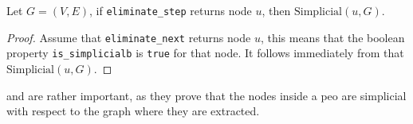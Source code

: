 \begin{corollary}\label{cor:essound1}
    Let $G = (V, E)$, if \texttt{eliminate\_step} returns node $u$, then $\mathrm{Simplicial}(u, G)$.
\end{corollary}
\begin{proof}
    Assume that \texttt{eliminate\_next} returns node $u$, this means that the boolean property \texttt{is\_simplicialb} is \texttt{true} for that node. It follows immediately from  that $\mathrm{Simplicial}(u, G)$.
\end{proof}

 and  are rather important, as they prove that the nodes inside a \gls{peo} are simplicial with respect to the graph where they are extracted.
